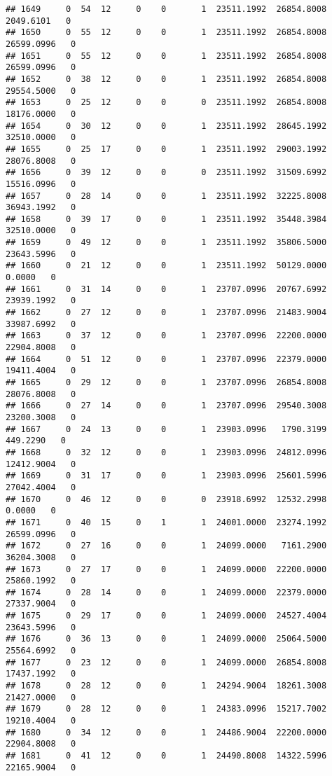 \documentclass[
]{article}
\begin{document}
\begin{enumerate}
\begin{verbatim}
## 1649     0  54  12     0    0       1  23511.1992  26854.8008   2049.6101   0
## 1650     0  55  12     0    0       1  23511.1992  26854.8008  26599.0996   0
## 1651     0  55  12     0    0       1  23511.1992  26854.8008  26599.0996   0
## 1652     0  38  12     0    0       1  23511.1992  26854.8008  29554.5000   0
## 1653     0  25  12     0    0       0  23511.1992  26854.8008  18176.0000   0
## 1654     0  30  12     0    0       1  23511.1992  28645.1992  32510.0000   0
## 1655     0  25  17     0    0       1  23511.1992  29003.1992  28076.8008   0
## 1656     0  39  12     0    0       0  23511.1992  31509.6992  15516.0996   0
## 1657     0  28  14     0    0       1  23511.1992  32225.8008  36943.1992   0
## 1658     0  39  17     0    0       1  23511.1992  35448.3984  32510.0000   0
## 1659     0  49  12     0    0       1  23511.1992  35806.5000  23643.5996   0
## 1660     0  21  12     0    0       1  23511.1992  50129.0000      0.0000   0
## 1661     0  31  14     0    0       1  23707.0996  20767.6992  23939.1992   0
## 1662     0  27  12     0    0       1  23707.0996  21483.9004  33987.6992   0
## 1663     0  37  12     0    0       1  23707.0996  22200.0000  22904.8008   0
## 1664     0  51  12     0    0       1  23707.0996  22379.0000  19411.4004   0
## 1665     0  29  12     0    0       1  23707.0996  26854.8008  28076.8008   0
## 1666     0  27  14     0    0       1  23707.0996  29540.3008  23200.3008   0
## 1667     0  24  13     0    0       1  23903.0996   1790.3199    449.2290   0
## 1668     0  32  12     0    0       1  23903.0996  24812.0996  12412.9004   0
## 1669     0  31  17     0    0       1  23903.0996  25601.5996  27042.4004   0
## 1670     0  46  12     0    0       0  23918.6992  12532.2998      0.0000   0
## 1671     0  40  15     0    1       1  24001.0000  23274.1992  26599.0996   0
## 1672     0  27  16     0    0       1  24099.0000   7161.2900  36204.3008   0
## 1673     0  27  17     0    0       1  24099.0000  22200.0000  25860.1992   0
## 1674     0  28  14     0    0       1  24099.0000  22379.0000  27337.9004   0
## 1675     0  29  17     0    0       1  24099.0000  24527.4004  23643.5996   0
## 1676     0  36  13     0    0       1  24099.0000  25064.5000  25564.6992   0
## 1677     0  23  12     0    0       1  24099.0000  26854.8008  17437.1992   0
## 1678     0  28  12     0    0       1  24294.9004  18261.3008  21427.0000   0
## 1679     0  28  12     0    0       1  24383.0996  15217.7002  19210.4004   0
## 1680     0  34  12     0    0       1  24486.9004  22200.0000  22904.8008   0
## 1681     0  41  12     0    0       1  24490.8008  14322.5996  22165.9004   0

\end{verbatim}
\end{enumerate}
\end{document}
